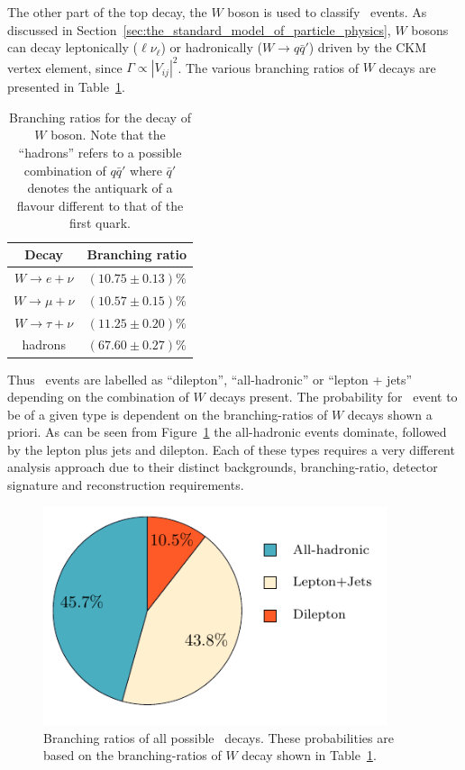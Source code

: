The other part of the top decay, the $W$ boson is used to classify \ttbar\ events. As discussed in Section~\ref{sec:the_standard_model_of_particle_physics}, $W$ bosons can decay leptonically ($\ell\nu_{\ell}$) or hadronically ($W\rightarrow q\bar{q}'$) driven by the CKM vertex element, since $\Gamma\propto|V_{ij}|^2$. The various branching ratios of $W$ decays are presented in Table~\ref{tab:TopQuakWDecayBranchingRatios}.

\begin{table}
  \centering
  \begin{tabular}{|c|c|}
    \hline
    Decay      & Branching ratio \\ \hline\hline
    $W\rightarrow e+\nu$    & $(10.75\pm0.13)\%$ \\
    $W\rightarrow \mu+\nu$  & $(10.57\pm0.15)\%$ \\
    $W\rightarrow \tau+\nu$ & $(11.25\pm0.20)\%$ \\
    hadrons    & $(67.60\pm0.27)\%$ \\
    \hline
  \end{tabular}
  \caption{Branching ratios for the decay of $W$ boson. Note that the ``hadrons'' refers to a possible combination of $q\bar{q}'$ where $\bar{q}'$ denotes the antiquark of a flavour different to that of the first quark.}
  \label{tab:TopQuakWDecayBranchingRatios}
\end{table}

Thus \ttbar\ events are labelled as ``dilepton'', ``all-hadronic'' or ``lepton + jets'' depending on the combination of $W$ decays present. The probability for \ttbar\ event to be of a given type is dependent on the branching-ratios of $W$ decays shown a priori. As can be seen from Figure~\ref{fig:TopQuarkDecayModes} the all-hadronic events dominate, followed by the lepton plus jets and dilepton. Each of these types requires a very different analysis approach due to their distinct backgrounds, branching-ratio, detector signature and reconstruction requirements.

\begin{figure}[tbhp]
  \centering
  \includegraphics[width=0.90\textwidth]{PartTopQuark/Diagrams/TopQuarkDecayPie.pdf}
  \caption{Branching ratios of all possible \ttbar\ decays. These probabilities are based on the branching-ratios of $W$ decay shown in Table~\ref{tab:TopQuakWDecayBranchingRatios}.}
  \label{fig:TopQuarkDecayModes}
\end{figure}

